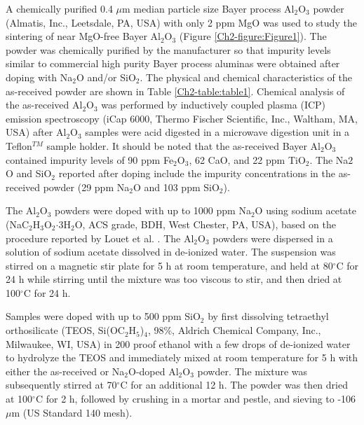 A chemically purified 0.4 $\mu$m median particle size Bayer process Al$_{2}$O$_{3}$ powder (Almatis, Inc., Leetsdale, PA, USA) with only 2 ppm MgO was used to study the sintering of near MgO-free Bayer Al$_{2}$O$_{3}$ (Figure \ref{Ch2-figure:Figure1}). The powder was chemically purified by the manufacturer so that impurity levels similar to commercial high purity Bayer process aluminas were obtained after doping with Na$_{2}$O and/or SiO$_{2}$. The physical and chemical characteristics of the as-received powder are shown in Table \ref{Ch2-table:table1}. Chemical analysis of the as-received Al$_{2}$O$_{3}$ was performed by inductively coupled plasma (ICP) emission spectroscopy (iCap 6000, Thermo Fischer Scientific, Inc., Waltham, MA, USA) after Al$_{2}$O$_{3}$ samples were acid digested in a microwave digestion unit in a Teflon$^{TM}$ sample holder.  It should be noted that the as-received Bayer Al$_{2}$O$_{3}$ contained impurity levels of 90 ppm Fe$_{2}$O$_{3}$, 62 CaO, and 22 ppm TiO$_{2}$.  The Na${2}$O and SiO$_{2}$ reported after doping include the impurity concentrations in the as-received powder (29 ppm Na$_{2}$O and 103 ppm SiO$_{2}$). 

The Al$_{2}$O$_{3}$ powders were doped with up to 1000 ppm Na$_{2}$O using sodium acetate (NaC$_{2}$H$_{3}$O$_{2}$$\cdot$3H$_{2}$O, ACS grade, BDH, West Chester, PA, USA), based on the procedure reported by Louet et al. \cite{Louet2005}. The Al$_{2}$O$_{3}$ powders were dispersed in a solution of sodium acetate dissolved in de-ionized water. The suspension was stirred on a magnetic stir plate for 5 h at room temperature, and held at 80$^{\circ}$C for 24 h while stirring until the mixture was too viscous to stir, and then dried at 100$^{\circ}$C for 24 h. 

Samples were doped with up to 500 ppm SiO$_{2}$ by first dissolving tetraethyl orthosilicate (TEOS, Si(OC$_{2}$H$_{5}$)$_{4}$, 98\%, Aldrich Chemical Company, Inc., Milwaukee, WI, USA) in 200 proof ethanol with a few drops of de-ionized water to hydrolyze the TEOS and immediately mixed at room temperature for 5 h with either the as-received or Na$_{2}$O-doped Al$_{2}$O$_{3}$ powder. The mixture was subsequently stirred at 70$^{\circ}$C for an additional 12 h. The powder was then dried at 100$^{\circ}$C for 2 h, followed by crushing in a mortar and pestle, and sieving to -106 $\mu$m (US Standard 140 mesh).

